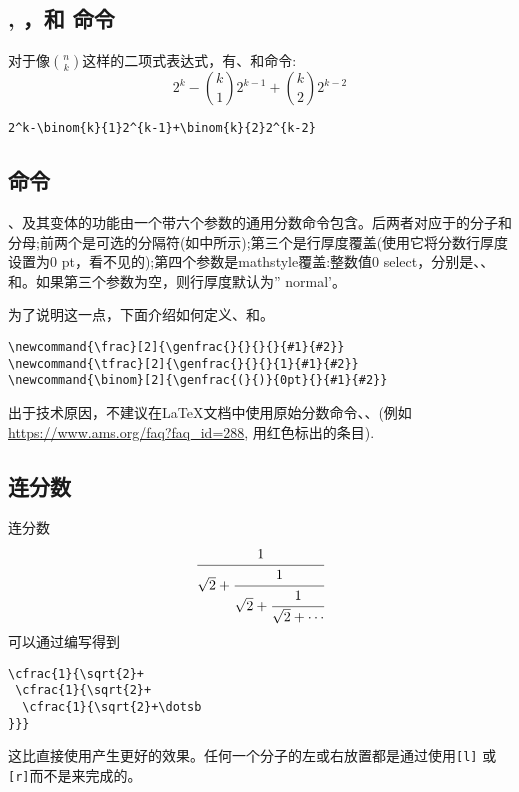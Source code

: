 \subsection{, ，和
         命令}

对于像$\binom{n}{k}$这样的二项式表达式，有、和命令:
\begin{equation}
2^k-\binom{k}{1}2^{k-1}+\binom{k}{2}2^{k-2}
\end{equation}
\begin{verbatim}
2^k-\binom{k}{1}2^{k-1}+\binom{k}{2}2^{k-2}
\end{verbatim}

\subsection{ 命令}

、及其变体的功能由一个带六个参数的通用分数命令包含。后两者对应于的分子和分母;前两个是可选的分隔符(如中所示);第三个是行厚度覆盖(使用它将分数行厚度设置为0 pt\mdash，看不见的);第四个参数是mathstyle覆盖:整数值0 select，分别是、、和。如果第三个参数为空，则行厚度默认为'' normal'。
\begin{cmdspec}[25em]
\string\genfrac {}  
  
\end{cmdspec}
为了说明这一点，下面介绍如何定义、和。
\begin{verbatim}
\newcommand{\frac}[2]{\genfrac{}{}{}{}{#1}{#2}}
\newcommand{\tfrac}[2]{\genfrac{}{}{}{1}{#1}{#2}}
\newcommand{\binom}[2]{\genfrac{(}{)}{0pt}{}{#1}{#2}}
\end{verbatim}

\begin{notes}
  \singlenote 出于技术原因，不建议在\LaTeX{}文档中使用原始分数命令、、(例如 \url{https://www.ams.org/faq?faq\_id=288},
  用红色标出的条目).
\end{notes}

\subsection{连分数}

连分数
\begin{equation}
\cfrac{1}{\sqrt{2}+
 \cfrac{1}{\sqrt{2}+
  \cfrac{1}{\sqrt{2}+\cdots
}}}
\end{equation}
可以通过编写得到
{\samepage
\begin{verbatim}
\cfrac{1}{\sqrt{2}+
 \cfrac{1}{\sqrt{2}+
  \cfrac{1}{\sqrt{2}+\dotsb
}}}
\end{verbatim}
}%
这比直接使用产生更好的效果。任何一个分子的左或右放置都是通过使用\verb|[l]| 或 \verb|[r]|而不是来完成的。

